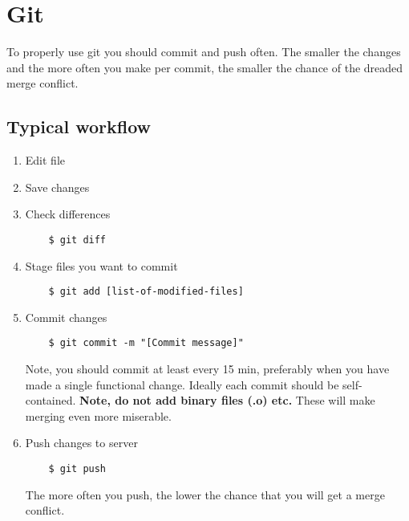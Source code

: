 \chapter{Git}
\label{git}

To properly use git you should commit and push often. The smaller the
changes and the more often you make per commit, the smaller the chance
of the dreaded merge conflict.


\section{Typical workflow}
\label{git-workflow}

\begin{enumerate}
\item Edit file

\item Save changes

\item Check differences

\begin{verbatim}
    $ git diff
\end{verbatim}

\item Stage files you want to commit

\begin{verbatim}
    $ git add [list-of-modified-files]
\end{verbatim}

\item Commit changes

\begin{verbatim}
    $ git commit -m "[Commit message]"
\end{verbatim}

Note, you should commit at least every 15 min, preferably when you
have made a single functional change.  Ideally each commit should be
self-contained.  \textbf{Note, do not add binary files (.o) etc.}
These will make merging even more miserable.

\item Push changes to server

\begin{verbatim}
    $ git push
\end{verbatim}

The more often you push, the lower the chance that you will get a
merge conflict.

\end{enumerate}


